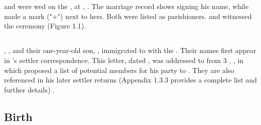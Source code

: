 \chapter[James McDonald]{\mcdonaldJName{}}
\label{ch1: James McDonald}


\section[Mary Welch]{\welchMName{}}
\label{sec: James McDonald and Mary Welch}

\mcdonaldJName{} and \welchMName{} were wed on the , at \stBotolphWithoutBishopsgate{}, \bishopsgateFull{} \autocite{FS:JamesMcDonaldMarriage} \autocite{settlers:JamesMcDonald}. The marriage record shows \mcdonaldJNameOnly{} signing his name, while \welchMNameOnly{} made a mark ("+") next to hers. Both were listed as parishioners. \nettoIName{} and \nettoCNameNee{} witnessed the ceremony (Figure 1.1).

\section[South Africa]{{\southAfrica{}}}
\label{sec: Immigration to South Africa}

\mcdonaldJNameOnly{}, \welchMNameOnly{}, and their one-year-old son, \mcdonaldANameOnly{}, immigrated to \southAfrica{} with the \settlersBritish{} \autocite[46]{nash:1820}. Their names first appear in \biggarAName{}'s settler correspondence. This letter, dated , was addressed to \bathhurstHName{} from 3 \northumberlandCourtFull{}, \london{}, in which \biggarASurname{} proposed a list of potential members for his party to \southAfrica \autocite[536-539]{eggsa:biggarCorrespondance}. They are also referenced in his later settler returns (Appendix 1.3.3 provides a complete list and further details) \autocite{eggsa:biggarReturn}.

\section[Birth]{Birth}
\label{sec: Birth}

